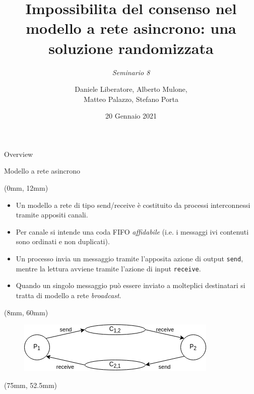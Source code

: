 \documentclass{beamer}
\title[Seminario 8]{\textbf{Impossibilita del consenso nel modello a rete asincrono: una soluzione randomizzata}}
\subtitle{\scriptsize \textit{Seminario 8}}
\author[Liberatore, Mulone, Palazzo, Porta]{Daniele Liberatore, Alberto Mulone, \\ Matteo Palazzo, Stefano Porta}
\institute[]{Università degli Studi di Torino}
\date{20 Gennaio 2021}
\begin{document}
{
    \beamertemplatenavigationsymbolsempty
    \begin{frame}
        \titlepage
    \end{frame}
    \addtocounter{framenumber}{-1}
}

\begin{frame}{Overview}
    \tableofcontents
\end{frame}


\begin{frame}{Modello a rete asincrono}
\begin{textblock*}{\textwidth}(0mm, 12mm)
\begin{itemize}
    \item Un modello a rete di tipo send/receive è costituito da processi interconnessi tramite appositi canali.
    \item Per canale si intende una coda FIFO \textit{affidabile} (i.e. i messaggi ivi contenuti sono ordinati e non duplicati).
    \item Un processo invia un messaggio tramite l'apposita azione di output \texttt{send}, mentre la lettura avviene tramite l'azione di input \texttt{receive}.
    \item Quando un singolo messaggio può essere inviato a molteplici destinatari si tratta di modello a rete \textit{broadcast}.
\end{itemize}
\end{textblock*}
\begin{textblock*}{0.45\textwidth}(8mm, 60mm)
\begin{block}{}
    \begin{figure}
        \centering
        \includegraphics[scale=0.4]{modello_a_rete.png}
    \end{figure}
    \end{block}
\end{textblock*}
\begin{textblock*}{0.3\textwidth}(75mm, 52.5mm)
\begin{block}{}

\end{block}
\end{textblock*}
\end{frame}
\end{document}
